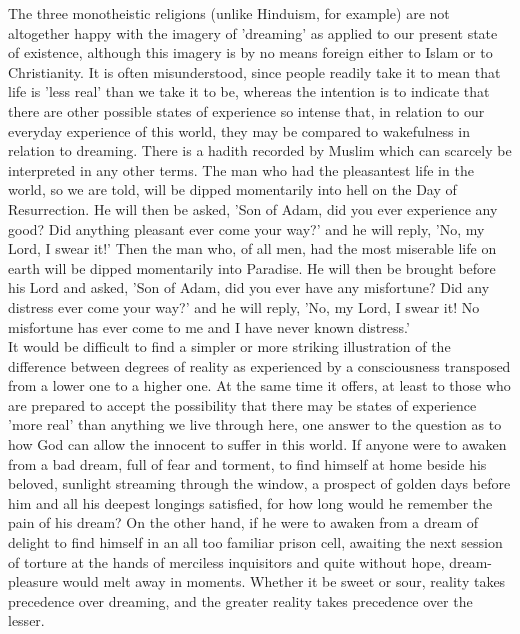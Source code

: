 \documentclass[10pt, twoside]{book}
\begin{document}
The three monotheistic religions (unlike Hinduism, for example) are not altogether happy with the 
imagery of 'dreaming' as applied to our present state of existence, although this imagery is by no 
means foreign either to Islam or to Christianity. It is often misunderstood, since people readily take 
it to mean that life is 'less real' than we take it to be, whereas the intention is to indicate that 
there are other possible states of experience so intense that, in relation to our everyday experience 
of this world, they may be compared to wakefulness in relation to dreaming. There is a hadith 
recorded by Muslim which can scarcely be interpreted in any other terms. The man who had the 
pleasantest life in the world, so we are told, will be dipped momentarily into hell on the Day of 
Resurrection. He will then be asked, 'Son of Adam, did you ever experience any good? Did anything 
pleasant ever come your way?' and he will reply, 'No, my Lord, I swear it!' Then the man who, of all 
men, had the most miserable life on earth will be dipped momentarily into Paradise. He will then be 
brought before his Lord and asked, 'Son of Adam, did you ever have any misfortune? Did any distress 
ever come your way?' and he will reply, 'No, my Lord, I swear it! No misfortune has ever come to me 
and I have never known distress.' \\

It would be difficult to find a simpler or more striking illustration of the difference between 
degrees of reality as experienced by a consciousness transposed from a lower one to a higher one. At 
the same time it offers, at least to those who are prepared to accept the possibility that there may 
be states of experience 'more real' than anything we live through here, one answer to the question as 
to how God can allow the innocent to suffer in this world. If anyone were to awaken from a bad dream, 
full of fear and torment, to find himself at home beside his beloved, sunlight streaming through the 
window, a prospect of golden days before him and all his deepest longings satisfied, for how long 
would he remember the pain of his dream? On the other hand, if he were to awaken from a dream of 
delight to find himself in an all too familiar prison cell, awaiting the next session of torture at 
the hands of merciless inquisitors and quite without hope, dream\hyp{}pleasure would melt away in moments. 
Whether it be sweet or sour, reality takes precedence over dreaming, and the greater reality takes 
precedence over the lesser. \\
\end{document}
